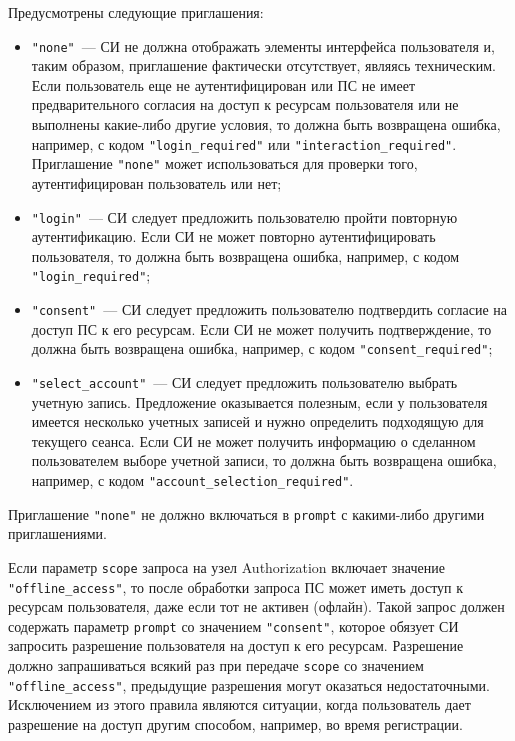 Предусмотрены следующие приглашения:
%
\begin{itemize}
\item
\lstinline{"none"}~--- 
СИ не должна отображать элементы интерфейса пользователя и, таким образом, 
приглашение фактически отсутствует, являясь техническим.
%
Если пользователь еще не аутентифицирован или ПС не имеет предварительного
согласия на доступ к ресурсам пользователя или не выполнены какие-либо другие 
условия, то должна быть возвращена ошибка, например, с кодом 
\lstinline{"login_required"} или \lstinline{"interaction_required"}.
%
Приглашение \lstinline{"none"} может использоваться для проверки того, 
аутентифицирован пользователь или нет;

 
\item
\lstinline{"login"}~--- 
СИ следует предложить пользователю пройти повторную аутентификацию.
%
Если СИ не может повторно аутентифицировать пользователя, то должна быть 
возвращена ошибка, например, с кодом \lstinline{"login_required"};

\item
\lstinline{"consent"}~--- 
СИ следует предложить пользователю подтвердить согласие на доступ ПС к его 
ресурсам. 
%
Если СИ не может получить подтверждение, то должна быть возвращена
ошибка, например, с кодом \lstinline{"consent_required"};

\item
\lstinline{"select_account"}~--- 
СИ следует предложить пользователю выбрать учетную запись.
%
Предложение оказывается полезным, если у пользователя имеется несколько учетных 
записей и нужно определить подходящую для текущего сеанса.
%
Если СИ не может получить информацию о сделанном пользователем выборе 
учетной записи, то должна быть возвращена ошибка, например, с кодом
\lstinline{"account_selection_required"}.
\end{itemize}

Приглашение \lstinline{"none"} не должно включаться в \lstinline{prompt} с 
какими-либо другими приглашениями. 

Если параметр \lstinline{scope} запроса на узел Authorization включает значение
\lstinline{"offline_access"}, то после обработки запроса ПС может иметь
доступ к ресурсам пользователя, даже если тот не активен (офлайн).
%
Такой запрос должен содержать параметр \lstinline{prompt} со значением 
\lstinline{"consent"}, которое обязует СИ запросить разрешение пользователя 
на доступ к его ресурсам. 
%
Разрешение должно запрашиваться всякий раз при передаче \lstinline{scope}
со значением \lstinline{"offline_access"}, предыдущие разрешения могут 
оказаться недостаточными.
%
Исключением из этого правила являются ситуации, когда пользователь дает 
разрешение на доступ другим способом, например, во время регистрации.

